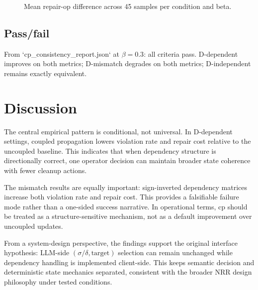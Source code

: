 \documentclass[11pt,a4paper]{article}
\begin{document}
\begin{figure}[t]
\centering
{}
\caption{Mean repair-op difference across 45 samples per condition and beta.}
\label{fig:rdiff}
\end{figure}

\subsection{Pass/fail}
From `cp\_consistency\_report.json` at \(\beta=0.3\): all criteria pass.
D-dependent improves on both metrics; D-mismatch degrades on both metrics; D-independent remains exactly equivalent.

\section{Discussion}
The central empirical pattern is conditional, not universal. In D-dependent settings, coupled propagation lowers violation rate and repair cost relative to the uncoupled baseline. This indicates that when dependency structure is directionally correct, one operator decision can maintain broader state coherence with fewer cleanup actions.

The mismatch results are equally important: sign-inverted dependency matrices increase both violation rate and repair cost. This provides a falsifiable failure mode rather than a one-sided success narrative. In operational terms, cp should be treated as a structure-sensitive mechanism, not as a default improvement over uncoupled updates.

From a system-design perspective, the findings support the original interface hypothesis: LLM-side \((\sigma/\delta,\text{target})\) selection can remain unchanged while dependency handling is implemented client-side. This keeps semantic decision and deterministic state mechanics separated, consistent with the broader NRR design philosophy under tested conditions.
\end{document}
